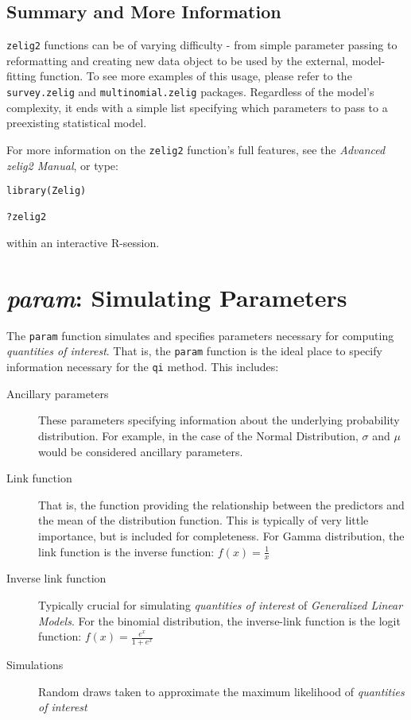\documentclass{article}
\newcommand{\code}[1]{{\tt #1}}
\begin{document}
\subsection{Summary and More Information}

\code{zelig2} functions can be of varying difficulty - from simple parameter passing to reformatting and creating new data object to be used by the external, model-fitting function. To see more examples of this usage, please refer to the \code{survey.zelig} and \code{multinomial.zelig} packages. Regardless of the model's complexity, it ends with a simple list specifying which parameters to pass to a preexisting statistical model.

For more information on the \code{zelig2} function's full features, see
the \emph{Advanced zelig2 Manual}, or type:

\begin{verbatim}
library(Zelig)

?zelig2
\end{verbatim}

within an interactive R-session.


\pagebreak
\section{\emph{param}: Simulating Parameters}
\label{section:param}


The \code{param} function simulates and specifies parameters necessary for computing
\emph{quantities of interest}. That is, the \code{param} function is the ideal place
to specify information necessary for the \code{qi} method. This includes:

\begin{description}

	\item[Ancillary parameters] These parameters specifying information about the
		underlying probability distribution. For example, in the case of the Normal
		Distribution, $\sigma$ and $\mu$ would be considered ancillary parameters.
	
	\item[Link function] That is, the function providing the relationship between
		the predictors and the mean of the distribution function. This is typically of
		very little importance, but is included for completeness. For Gamma distribution, the link function is the inverse function: $ f(x) = \frac{1}{x} $
	
	\item[Inverse link function] Typically crucial for simulating \emph{quantities of
		interest} of \emph{Generalized Linear Models}. For the binomial distribution, the inverse-link function is the logit function: $ f(x) = \frac{e^x}{1+e^x} $
	
	\item[Simulations] Random draws taken to approximate the  maximum likelihood of \emph{quantities of interest}

\end{description}
\end{document}
